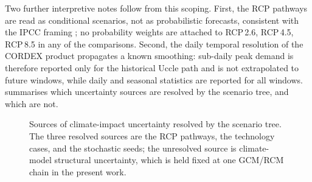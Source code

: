 Two further interpretive notes follow from this scoping. First, the RCP pathways are read as conditional scenarios, not as probabilistic forecasts, consistent with the IPCC framing \cite{IPCC2014SynthesisReport}; no probability weights are attached to RCP\,2.6, RCP\,4.5, RCP\,8.5 in any of the comparisons. Second, the daily temporal resolution of the CORDEX product propagates a known smoothing: sub-daily peak demand is therefore reported only for the historical Uccle path and is not extrapolated to future windows, while daily and seasonal statistics are reported for all windows.  summarises which uncertainty sources are resolved by the scenario tree, and which are not.

\begin{figure}[ht]
  \centering
  \caption{Sources of climate-impact uncertainty resolved by the scenario tree. The three resolved sources are the RCP pathways, the technology cases, and the stochastic seeds; the unresolved source is climate-model structural uncertainty, which is held fixed at one GCM/RCM chain in the present work.}
  \label{fig:climateUncertainty_scope}
\end{figure}


